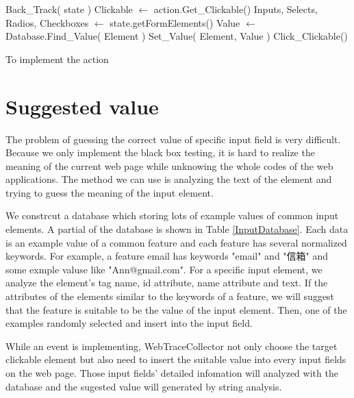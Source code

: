 \begin{algorithm}[htb]
	\begin{doublespace}		
		{
			Back\_Track( state )\;
		}
		Clickable $\gets$ action.Get\_Clickable()\;
		Inputs, Selects, Radios, Checkboxes $\gets$ state.getFormElements()\;
		{
			Value $\gets$ Database.Find\_Value( Element )\;
			Set\_Value( Element, Value )\;
		}
		Click\_Clickable()\;		
	\end{doublespace}
	\caption{To implement the action}
	\label{algorithm:action}
\end{algorithm} 


\clearpage

\section{Suggested value}

The problem of guessing the correct value of specific input field is very difficult.
Because we only implement the black box testing, it is hard to realize the meaning of the current web page
while unknowing the whole codes of the web applications.
The method we can use is analyzing the text of the element 
and trying to guess the meaning of the input element.

We constrcut a database which storing lots of example values of common input elements.
A partial of the database is shown in Table \ref{InputDatabase}.
Each data is an example value of a common feature 
and each feature has several normalized keywords.
For example, a feature email has keywords "email" and "信箱" and some exmple valuse like "Ann@gmail.com".
For a specific input element,
we analyze the element's tag name, id attribute, name attribute and text.
If the attributes of the elements similar to the keywords of a feature,
we will suggest that the feature is suitable to be the value of the input element.
Then, one of the examples randomly selected and insert into the input field.

While an event is implementing, WebTraceCollector not only choose the target clickable element
but also need to insert the suitable value into every input fields on the web page.
Those input fields' detailed infomation will analyzed with the database 
and the sugested value will generated by string analysis.


